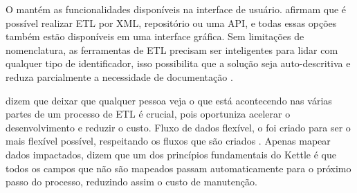 O \pdi mantém as funcionalidades disponíveis na interface de usuário.  afirmam que é possível realizar ETL por XML, repositório ou uma API, e todas essas opções também estão disponíveis em uma interface gráfica. Sem limitações de nomenclatura, as ferramentas de ETL precisam ser inteligentes para lidar com qualquer tipo de identificador, isso possibilita que a solução seja auto-descritiva e reduza parcialmente a necessidade de documentação \citep{kettle}.

 dizem que deixar que qualquer pessoa veja o que está acontecendo nas várias partes de um processo de ETL é crucial, pois oportuniza acelerar o desenvolvimento e reduzir o custo. Fluxo de dados flexível, o \pdi foi criado para ser o mais flexível possível, respeitando os fluxos que são criados \citep{kettle}. Apenas mapear dados impactados,  dizem que um dos princípios fundamentais do Kettle é que todos os campos que não são mapeados passam automaticamente para o próximo passo do processo, reduzindo assim o custo de manutenção.

